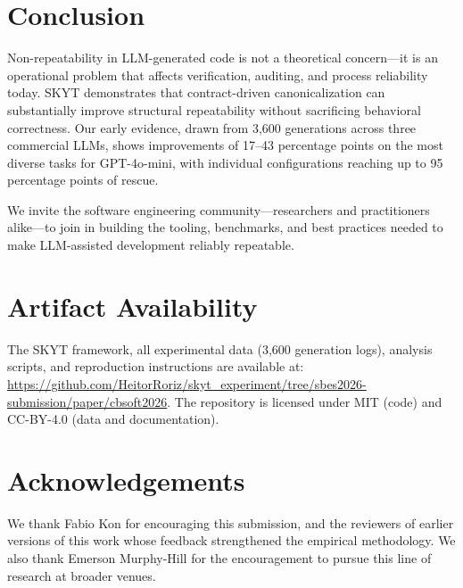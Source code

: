 \documentclass[sigconf]{acmart}
\begin{document}
\section{Conclusion}
\label{sec:conclusion}

Non-repeatability in LLM-generated code is not a theoretical concern---it is an operational problem that affects verification, auditing, and process reliability today.  SKYT demonstrates that contract-driven canonicalization can substantially improve structural repeatability without sacrificing behavioral correctness.  Our early evidence, drawn from 3{,}600 generations across three commercial LLMs, shows improvements of 17--43 percentage points on the most diverse tasks for GPT-4o-mini, with individual configurations reaching up to 95 percentage points of rescue.

We invite the software engineering community---researchers and practitioners alike---to join in building the tooling, benchmarks, and best practices needed to make LLM-assisted development reliably repeatable.

\section*{Artifact Availability}

The SKYT framework, all experimental data (3{,}600 generation logs), analysis scripts, and reproduction instructions are available at: \url{https://github.com/HeitorRoriz/skyt_experiment/tree/sbes2026-submission/paper/cbsoft2026}.  The repository is licensed under MIT (code) and CC-BY-4.0 (data and documentation).

\section*{Acknowledgements}

We thank Fabio Kon for encouraging this submission, and the reviewers of earlier versions of this work whose feedback strengthened the empirical methodology.  We also thank Emerson Murphy-Hill for the encouragement to pursue this line of research at broader venues.




\end{document}
